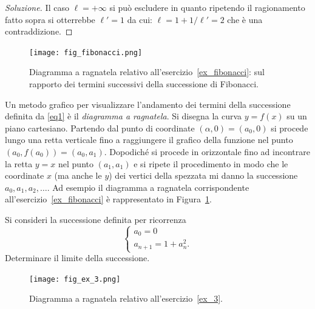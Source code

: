 \begin{proof}[Soluzione]
    Il caso $\ell=+\infty$ si può escludere in quanto ripetendo il
    ragionamento fatto sopra si otterrebbe $\ell' = 1$ da cui:
    $\ell = 1 + 1/\ell' = 2$ che è una contraddizione.
\end{proof}

\begin{figure}
  \begin{center}
    \texttt{[image: fig\_fibonacci.png]}
  \end{center}
  \caption{Diagramma a ragnatela relativo
    all'esercizio~\ref{ex_fibonacci}:
    sul rapporto dei termini successivi della successione di Fibonacci.}
  \label{fig_fibonacci}
\end{figure}

Un metodo grafico per visualizzare l'andamento dei termini della
successione definita da \eqref{eq1} è il \emph{diagramma a
  ragnatela}. Si disegna la curva $y=f(x)$ su un piano
cartesiano. Partendo dal punto di coordinate $(\alpha, 0)=(a_0, 0)$ si procede
lungo una retta verticale fino a raggiungere il grafico della funzione
nel punto $(a_0, f(a_0)) = (a_0, a_1)$.
Dopodiché si procede in
orizzontale fino ad incontrare la retta $y=x$ nel punto $(a_1,a_1)$ e
si ripete il procedimento in modo che le coordinate $x$ (ma anche le $y$)
dei vertici della spezzata mi danno la successione $a_0, a_1, a_2,
\dots$. Ad esempio il diagramma a ragnatela corrispondente
all'esercizio~\ref{ex_fibonacci} è rappresentato in
Figura~\ref{fig_fibonacci}.

\begin{exercise}\label{ex_3}
  Si consideri la successione definita per ricorrenza
  \[
  \begin{cases}
    a_0 = 0\\
    a_{n+1} =1 + a_n^2.
  \end{cases}
  \]
  Determinare il limite della successione.
\end{exercise}

\begin{figure}
  \begin{center}
    \texttt{[image: fig\_ex\_3.png]}
  \end{center}
  \caption{Diagramma a ragnatela relativo
    all'esercizio~\ref{ex_3}.}
  \label{fig_ex_3}
\end{figure}

